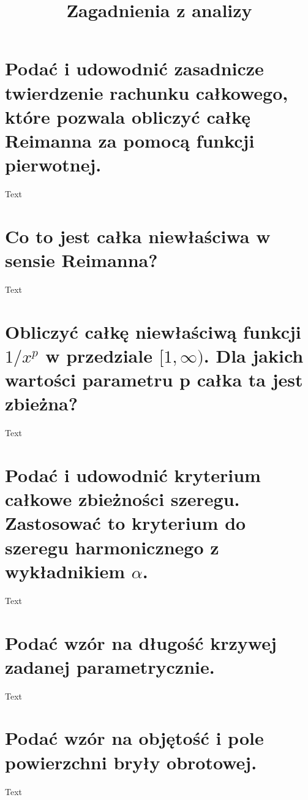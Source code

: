 \documentclass{article}
\title{Zagadnienia z analizy}
\begin{document}
\makeatletter
{}
\makeatother

\begin{titlepage}
	\makeatletter
	\vfill
	\begin{center}
		\vspace*{0.3\textheight}
		{\LARGE
			\@title
		\par}
	\end{center}\par
	\vfill
	\@thanks
	\vfill
	\tableofcontents
	\vfill
	\makeatother
\end{titlepage}

\newpage

\linespread{1.3}
\setcounter{page}{1}

\setcounter{section}{63}
\section{Podać i udowodnić zasadnicze twierdzenie rachunku całkowego,
które pozwala obliczyć całkę Reimanna za pomocą funkcji pierwotnej.}
Text


\section{Co to jest całka niewłaściwa w sensie Reimanna?}
Text


\section{Obliczyć całkę niewłaściwą funkcji
	\texorpdfstring{$ 1 / x^p $}{1/x\textasciicircum p}
	w przedziale
	\texorpdfstring{$ [ 1, \infty ) $}{[1,inf)}.
	Dla jakich wartości parametru p całka ta jest zbieżna?}
Text


\section{Podać i udowodnić kryterium całkowe zbieżności szeregu.
	Zastosować to kryterium do szeregu harmonicznego z wykładnikiem
	\texorpdfstring{$ \alpha $}{a}.}
Text


\section{Podać wzór na długość krzywej zadanej parametrycznie.}
Text


\section{Podać wzór na objętość i pole powierzchni bryły obrotowej.}
Text
\end{document}
